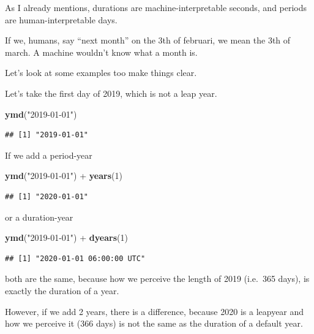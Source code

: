 \documentclass[]{tufte-book}
\newenvironment{Shaded}{}{}
\newcommand{\DecValTok}[1]{\textcolor[rgb]{0.25,0.63,0.44}{#1}}
\newcommand{\KeywordTok}[1]{\textcolor[rgb]{0.00,0.44,0.13}{\textbf{#1}}}
\newcommand{\NormalTok}[1]{#1}
\newcommand{\OperatorTok}[1]{\textcolor[rgb]{0.40,0.40,0.40}{#1}}
\newcommand{\StringTok}[1]{\textcolor[rgb]{0.25,0.44,0.63}{#1}}
\begin{document}
As I already mentions, durations are machine-interpretable seconds, and periods are human-interpretable days.

If we, humans, say ``next month'' on the 3th of februari, we mean the 3th of march. A machine wouldn't know what a month is.

Let's look at some examples too make things clear.

Let's take the first day of 2019, which is not a leap year.

\begin{Shaded}
\begin{Highlighting}[]
\KeywordTok{ymd}\NormalTok{(}\StringTok{"2019-01-01"}\NormalTok{)}
\end{Highlighting}
\end{Shaded}

\begin{verbatim}
## [1] "2019-01-01"
\end{verbatim}

If we add a period-year

\begin{Shaded}
\begin{Highlighting}[]
\KeywordTok{ymd}\NormalTok{(}\StringTok{"2019-01-01"}\NormalTok{) }\OperatorTok{+}\StringTok{ }\KeywordTok{years}\NormalTok{(}\DecValTok{1}\NormalTok{)}
\end{Highlighting}
\end{Shaded}

\begin{verbatim}
## [1] "2020-01-01"
\end{verbatim}

or a duration-year

\begin{Shaded}
\begin{Highlighting}[]
\KeywordTok{ymd}\NormalTok{(}\StringTok{"2019-01-01"}\NormalTok{) }\OperatorTok{+}\StringTok{ }\KeywordTok{dyears}\NormalTok{(}\DecValTok{1}\NormalTok{)}
\end{Highlighting}
\end{Shaded}

\begin{verbatim}
## [1] "2020-01-01 06:00:00 UTC"
\end{verbatim}

both are the same, because how we perceive the length of 2019 (i.e.~365 days), is exactly the duration of a year.

However, if we add 2 years, there is a difference, because 2020 is a leapyear and how we perceive it (366 days) is not the same as the duration of a default year.
\end{document}
